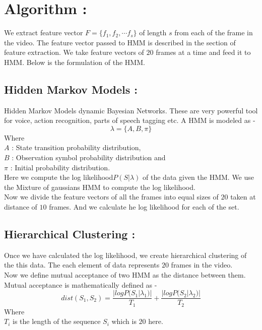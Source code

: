 \documentclass[10pt, twocolumn]{article}
\begin{document}
\section*{Algorithm :} We extract feature vector $F =  \{f_1, f_2, \cdots f_s \}$ of length $s$ from each of the  frame in the video. The feature vector passed to HMM is described in the section of feature extraction. We take feature vectors of $20$ frames at a time and feed it to HMM. Below is the formulation of the HMM.\\
\subsection*{Hidden Markov Models :}
	Hidden Markov Models dynamic Bayesian Networks. These are very powerful tool for voice, action recognition\cite{Rabiner89atutorial}, parts of speech tagging etc. A HMM is modeled as  - 
	$$\lambda = \{ A, B, \pi \}$$ 
	Where \\
	\hspace*{30pt} $A$ : State transition probability distribution,\\
	\hspace*{30pt} $B$ : Observation symbol probability distribution and \\
	\hspace*{30pt} $\pi$ : Initial probability distribution.\\ 

Here we compute the log likelihood$P(S|\lambda)$ of the data given the HMM. We use the Mixture of gaussians HMM to compute the log likelihood.\\
Now we divide the feature vectors of all the frames into equal sizes of $20$ taken at distance of $10$ frames. And we calculate he log likelihood for each of the set.\\
\subsection*{Hierarchical Clustering :}
Once we have calculated the log likelihood, we create hierarchical clustering of the this data. The each element of data represents $20$ frames in the video.\\
Now we define mutual acceptance of two HMM as the distance between them. Mutual acceptance is mathematically defined as - \\
$$dist(S_1, S_2) = \frac{|logP(S_1|\lambda _ 1)|}{T_1} +\frac{|logP(S_2|\lambda _ 2)|}{T_2} $$
Where\\
\hspace*{30pt} $T_i$ is the length of the sequence $S_i$ which is $20$ here.\\
\end{document}
